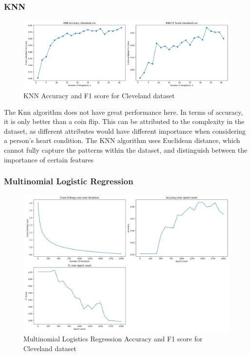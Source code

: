 \documentclass[letterpaper]{article}
\begin{document}
\subsubsection*{KNN}
\begin{figure}[H]
	\includegraphics[width=\textwidth]{figures/knn_cleveland.csv.png}
	\caption{KNN Accuracy and F1 score for Cleveland dataset}
	\label{fig:knn-cleveland}
\end{figure}
The Knn algorithm does not have great performance here. In terms of accuracy, it is only better than a coin flip. This can be attributed to the complexity in the dataset, as different attributes would have different importance when considering a person's heart condition. The KNN algorithm uses Euclidean distance, which cannot fully capture the patterns within the dataset, and distinguish between the importance of certain features

\subsubsection*{Multinomial Logistic Regression}
\begin{figure}[H]
	\includegraphics[width=\textwidth]{figures/logistics_cleveland.csv.png}
	\caption{Multinomial Logistics Regression Accuracy and F1 score for Cleveland dataset}
	\label{fig:logistic-cleveland}
\end{figure}
\end{document}
